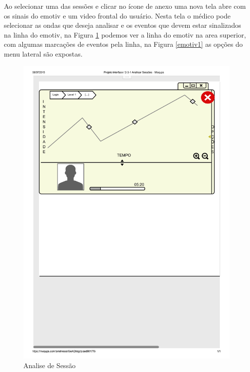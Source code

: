 \documentclass[12pt]{article}
\begin{document}
Ao selecionar uma das sessões e clicar no ícone de anexo uma nova tela abre com os sinais do emotiv e um video frontal do usuário. Nesta tela o médico pode selecionar as ondas que deseja analisar e os eventos que devem estar sinalizados na linha do emotiv, na Figura \ref{emotiv} podemos ver a linha do emotiv na area superior, com algumas marcações de eventos pela linha, na Figura \ref{emotiv1} as opções do menu lateral são expostas. 

\begin{figure}[h]
\centering
\includegraphics[scale=0.6]{imagens/2-3-1Analisar_Sessoes1.pdf}
\caption{Analise de Sessão}
\label{emotiv}
\end{figure}
\end{document}

